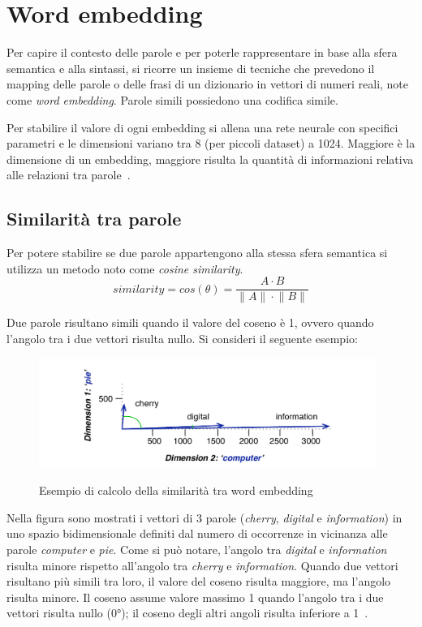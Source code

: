 \section{Word embedding}
\label{sec:word embedding}
Per capire il contesto delle parole e per poterle rappresentare in base alla sfera semantica e alla sintassi, si ricorre un insieme di tecniche che prevedono il mapping delle parole o delle frasi di un dizionario in vettori di numeri reali, note come \emph{word embedding}.
Parole simili possiedono una codifica simile.


Per stabilire il valore di ogni embedding si allena una rete neurale con specifici parametri e le dimensioni variano tra 8 (per piccoli dataset) a 1024. Maggiore è la dimensione di un embedding, maggiore risulta la quantità di informazioni relativa alle relazioni tra parole~\cite{tensword}.

\subsection{Similarità tra parole}
\label{Similarita tra parole}
Per potere stabilire se due parole appartengono alla stessa sfera semantica si utilizza un metodo noto come \emph{cosine similarity}.
\begin{equation}
    similarity = cos(\theta) = \frac{A\cdot{B}}{\|A\|\cdot{\|B\|}}
\end{equation}

Due parole risultano simili quando il valore del coseno è 1, ovvero quando l'angolo tra i due vettori risulta nullo. Si consideri il seguente esempio:

\begin{figure}[h]
    \centering
    \includegraphics[width=11cm]{./immagini/cosine_similarity_esempio.png}
    \label{cosine}
    \caption{Esempio di calcolo della similarità tra word embedding~\cite{cosine}}
\end{figure}

Nella figura sono mostrati i vettori di 3 parole (\textit{cherry}, \textit{digital} e \textit{information}) in uno spazio bidimensionale definiti dal numero di occorrenze in vicinanza alle parole \textit{computer} e \textit{pie}.
Come si può notare, l'angolo tra \textit{digital} e \textit{information} risulta minore rispetto all'angolo tra \textit{cherry} e \textit{information}.
Quando due vettori risultano più simili tra loro, il valore del coseno risulta maggiore, ma l'angolo risulta minore. Il coseno assume valore massimo 1 quando l'angolo tra i due vettori risulta nullo (0°); il coseno degli altri angoli risulta inferiore a 1~\cite{cosine}.
